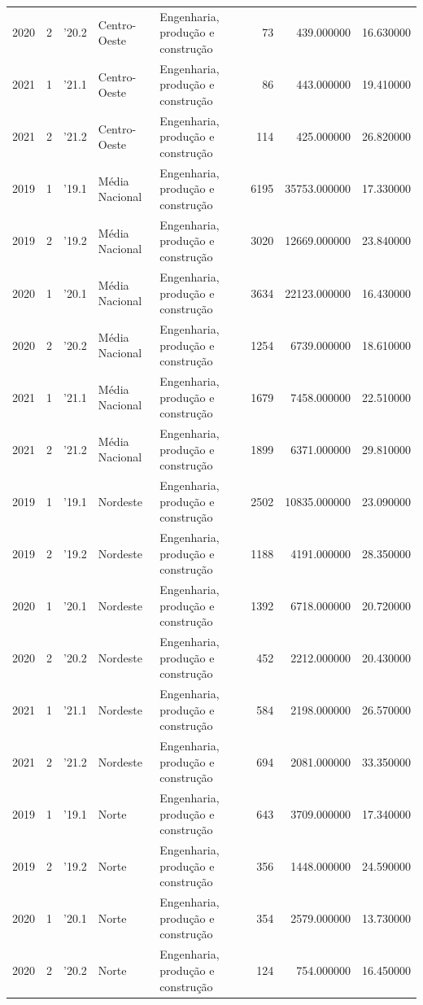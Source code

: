 \begin{longtable}{rrlllrrr}
2020 & 2 & '20.2 & Centro-Oeste & Engenharia, produção e construção & 73 & 439.000000 & 16.630000 \\
2021 & 1 & '21.1 & Centro-Oeste & Engenharia, produção e construção & 86 & 443.000000 & 19.410000 \\
2021 & 2 & '21.2 & Centro-Oeste & Engenharia, produção e construção & 114 & 425.000000 & 26.820000 \\
2019 & 1 & '19.1 & Média Nacional & Engenharia, produção e construção & 6195 & 35753.000000 & 17.330000 \\
2019 & 2 & '19.2 & Média Nacional & Engenharia, produção e construção & 3020 & 12669.000000 & 23.840000 \\
2020 & 1 & '20.1 & Média Nacional & Engenharia, produção e construção & 3634 & 22123.000000 & 16.430000 \\
2020 & 2 & '20.2 & Média Nacional & Engenharia, produção e construção & 1254 & 6739.000000 & 18.610000 \\
2021 & 1 & '21.1 & Média Nacional & Engenharia, produção e construção & 1679 & 7458.000000 & 22.510000 \\
2021 & 2 & '21.2 & Média Nacional & Engenharia, produção e construção & 1899 & 6371.000000 & 29.810000 \\
2019 & 1 & '19.1 & Nordeste & Engenharia, produção e construção & 2502 & 10835.000000 & 23.090000 \\
2019 & 2 & '19.2 & Nordeste & Engenharia, produção e construção & 1188 & 4191.000000 & 28.350000 \\
2020 & 1 & '20.1 & Nordeste & Engenharia, produção e construção & 1392 & 6718.000000 & 20.720000 \\
2020 & 2 & '20.2 & Nordeste & Engenharia, produção e construção & 452 & 2212.000000 & 20.430000 \\
2021 & 1 & '21.1 & Nordeste & Engenharia, produção e construção & 584 & 2198.000000 & 26.570000 \\
2021 & 2 & '21.2 & Nordeste & Engenharia, produção e construção & 694 & 2081.000000 & 33.350000 \\
2019 & 1 & '19.1 & Norte & Engenharia, produção e construção & 643 & 3709.000000 & 17.340000 \\
2019 & 2 & '19.2 & Norte & Engenharia, produção e construção & 356 & 1448.000000 & 24.590000 \\
2020 & 1 & '20.1 & Norte & Engenharia, produção e construção & 354 & 2579.000000 & 13.730000 \\
2020 & 2 & '20.2 & Norte & Engenharia, produção e construção & 124 & 754.000000 & 16.450000 \\

\end{longtable}
